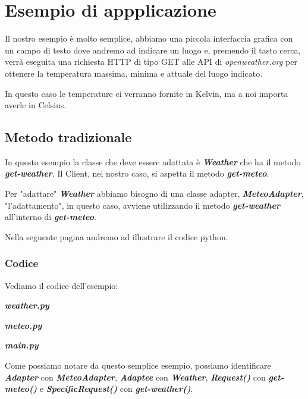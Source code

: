 \chapter{Esempio di appplicazione}

  Il nostro esempio è molto semplice, abbiamo una piccola interfaccia grafica
  con un campo di testo dove andremo ad indicare un luogo e, premendo il tasto
  cerca, verrà eseguita una richiesta HTTP di tipo GET alle API di \textit{openweather.org}
  per ottenere la temperatura massima, minima e attuale del luogo indicato.
  
  In questo caso le temperature ci verranno fornite in Kelvin, ma a noi importa
  averle in Celsius.
  
  \section{Metodo tradizionale}
  
  In questo esempio la classe che deve essere adattata è \textbf{\textit{Weather}} che ha il
  metodo 
  \textbf{\textit{get-weather}}. Il Client, nel nostro caso, 
  si aspetta il metodo \textbf{\textit{get-meteo}}.
  
  Per "adattare" \textbf{\textit{Weather}} abbiamo bisogno di una classe adapter,
  \textbf{\textit{MeteoAdapter}}, "l'adattamento", in questo caso, 
  avviene utilizzando il metodo \textbf{\textit{get-weather}} all'interno di 
  \textbf{\textit{get-meteo}}.
  
  Nella seguente pagina andremo ad illustrare il codice python.
  \newpage
  
  \subsection{Codice}
  
  Vediamo il codice dell'esempio:
  
  \textbf{\textit{weather.py}}
  
  
  \textbf{\textit{meteo.py}}
  
  
  \textbf{\textit{main.py}}
  
  
  Come possiamo notare da questo semplice esempio, possiamo identificare
  \textbf{\textit{Adapter}} con \textbf{\textit{MeteoAdapter}}, 
  \textbf{\textit{Adaptee}} con \textbf{\textit{Weather}},
  \textbf{\textit{Request()}} con \textbf{\textit{get-meteo()}} e 
  \textbf{\textit{SpecificRequest()}} con \textbf{\textit{get-weather()}}.
  
